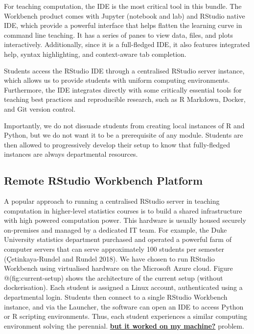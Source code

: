 \documentclass{article}
\begin{document}
For teaching computation, the IDE is the most critical tool in this
bundle. The Workbench product comes with Jupyter (notebook and lab) and
RStudio native IDE, which provide a powerful interface that helps
flatten the learning curve in command line teaching. It has a series of
panes to view data, files, and plots interactively. Additionally, since
it is a full-fledged IDE, it also features integrated help, syntax
highlighting, and context-aware tab completion.

Students access the RStudio IDE through a centralised RStudio server
instance, which allows us to provide students with uniform computing
environments. Furthermore, the IDE integrates directly with some
critically essential tools for teaching best practices and reproducible
research, such as R Markdown, Docker, and Git version control.

Importantly, we do not dissuade students from creating local instances
of R and Python, but we do not want it to be a prerequisite of any
module. Students are then allowed to progressively develop their setup
to know that fully-fledged instances are always departmental resources.

\hypertarget{remote-rstudio-workbench-platform}{%
\subsection{Remote RStudio Workbench
Platform}\label{remote-rstudio-workbench-platform}}

A popular approach to running a centralised RStudio server in teaching
computation in higher-level statistics courses is to build a shared
infrastructure with high powered computation power. This hardware is
usually housed securely on-premises and managed by a dedicated IT team.
For example, the Duke University statistics department purchased and
operated a powerful farm of computer servers that can serve
approximately 100 students per semester (Çetinkaya-Rundel and Rundel
2018). We have chosen to run RStudio Workbench using virtualised
hardware on the Microsoft Azure cloud. Figure @(fig:current-setup) shows
the architecture of the current setup (without dockerisation). Each
student is assigned a Linux account, authenticated using a departmental
login. Students then connect to a single RStudio Workbench instance, and
via the Launcher, the software can open an IDE to access Python or R
scripting environments. Thus, each student experiences a similar
computing environment solving the perennial.
\href{https://www.kevinwanke.com/why-you-should-never-use-the-phrase-but-it-works-on-my-machine/}{\textbf{but
it worked on my machine?}} problem.
\end{document}
